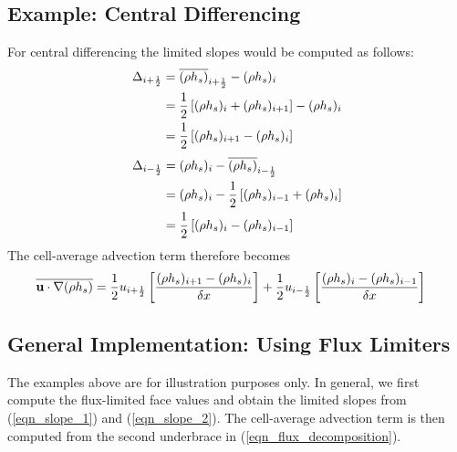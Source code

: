 \subsection{Example: Central Differencing}
For central differencing the limited slopes would be computed as follows:
\begin{align}
\Delta_{i+\mbox{\tiny $\frac{1}{2}$}} &= \overline{(\rho h_s)}_{i+\mbox{\tiny $\frac{1}{2}$}} - (\rho h_s)_i \notag\\
&= \frac{1}{2}\left[(\rho h_s)_i + (\rho h_s)_{i+1}\right] - (\rho h_s)_i \notag\\
&= \frac{1}{2}\left[(\rho h_s)_{i+1} - (\rho h_s)_i\right]
\end{align}
\begin{align}
\Delta_{i-\mbox{\tiny $\frac{1}{2}$}} &= (\rho h_s)_i - \overline{(\rho h_s)}_{i-\mbox{\tiny $\frac{1}{2}$}} \notag\\
&= (\rho h_s)_i - \frac{1}{2}\left[(\rho h_s)_{i-1} + (\rho h_s)_i\right] \notag\\
&= \frac{1}{2}\left[ (\rho h_s)_i - (\rho h_s)_{i-1} \right]
\end{align}
The cell-average advection term therefore becomes
\begin{align}
\overline{\mathbf{u}\cdot\nabla(\rho h_s)} &= \frac{1}{2}  u_{i+\mbox{\tiny $\frac{1}{2}$}} \left[ \frac{(\rho h_s)_{i+1} - (\rho h_s)_i}{\delta x} \right] + \frac{1}{2} u_{i-\mbox{\tiny $\frac{1}{2}$}} \left[ \frac{(\rho h_s)_i - (\rho h_s)_{i-1}}{\delta x} \right]
\end{align}

\subsection{General Implementation: Using Flux Limiters}
The examples above are for illustration purposes only.  In general, we first compute the flux-limited face values and obtain the limited slopes from (\ref{eqn_slope_1}) and (\ref{eqn_slope_2}).  The cell-average advection term is then computed from the second underbrace in (\ref{eqn_flux_decomposition}).


